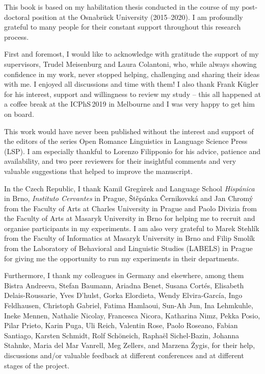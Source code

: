 
This book is based on my habilitation thesis conducted in the course of my post-doctoral position at the Osnabrück University (2015--2020). I am profoundly grateful to many people for their constant support throughout this research process.


First and foremost, I would like to acknowledge with gratitude the support of my supervisors, Trudel Meisenburg and Laura Colantoni, who, while always showing confidence in my work, never stopped helping, challenging and sharing their ideas with me. I enjoyed all discussions and time with them! I also thank Frank Kügler for his interest, support and willingness to review my study -- this all happened at a coffee break at the ICPhS\,2019 in Melbourne and I was very happy to get him on board.



This work would have never been published without the interest and support of the editors of the series Open Romance Linguistics in Language Science Press (LSP). I am especially thankful to Lorenzo Filipponio for his advice, patience and availability, and two peer reviewers for their insightful comments and very valuable suggestions that helped to improve the manuscript.



In the Czech Republic, I thank Kamil Gregůrek and Language School \textit{Hispánica} in Brno, \textit{Instituto Cervantes} in Prague, Štěpánka Černikovská and Jan Chromý from the Faculty of Arts at Charles University in Prague and Paolo Divizia from the Faculty of Arts at Masaryk University in Brno for helping me to recruit and organise participants in my experiments. I am also very grateful to Marek Stehlík from the Faculty of Informatics at Masaryk University in Brno and Filip Smolík from the Laboratory of Behavioral and Linguistic Studies (LABELS) in Prague for giving me the opportunity to run my experiments in their departments.



Furthermore, I thank my colleagues in Germany and elsewhere, among them Bistra Andreeva, Stefan Baumann, Ariadna Benet, Susana Cortés, Elisabeth De\-lais-Rous\-sa\-rie, Yves D’hulst, Gorka Elordieta, Wendy Elvira-García, Ingo Feldhausen, Christoph Gabriel, Fatima Hamlaoui, Sun-Ah Jun, Ina Lehmkuhle, Ineke Mennen, Nathalie Nicolay, Francesca Nicora, Katharina Nimz, Pekka Posio, Pilar Prieto, Karin Puga, Uli Reich, Valentin Rose, Paolo Roseano, Fabian Santiago, Karsten Schmidt, Rolf Schöneich, Raphaël Sichel-Bazin, Johanna Stahnke, Maria del Mar Vanrell, Meg Zellers, and Marzena Żygis, for their help, discussions and/or valuable feedback at different conferences and at different stages of the project. 



